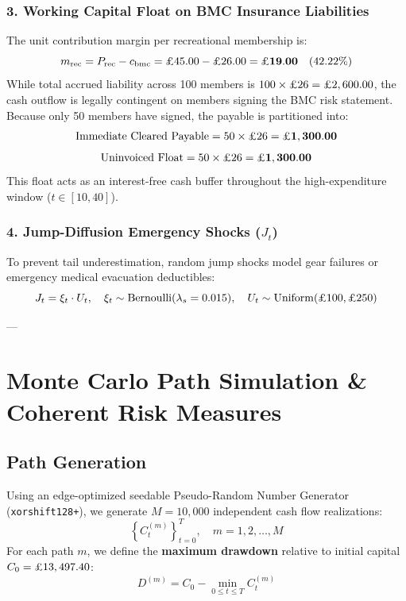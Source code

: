 \documentclass[11pt,a4paper]{article}
\begin{document}
\subsubsection{3. Working Capital Float on BMC Insurance Liabilities}
The unit contribution margin per recreational membership is:
\begin{equation}
m_{\text{rec}} = P_{\text{rec}} - c_{\text{bmc}} = \text{\pounds}45.00 - \text{\pounds}26.00 = \mathbf{\text{\pounds}19.00} \quad (42.22\%)
\end{equation}
While total accrued liability across 100 members is $100 \times \text{\pounds}26 = \text{\pounds}2,600.00$, the cash outflow is legally contingent on members signing the BMC risk statement. Because only 50 members have signed, the payable is partitioned into:
\begin{equation}
\text{Immediate Cleared Payable} = 50 \times \text{\pounds}26 = \mathbf{\text{\pounds}1,300.00}
\end{equation}
\begin{equation}
\text{Uninvoiced Float} = 50 \times \text{\pounds}26 = \mathbf{\text{\pounds}1,300.00}
\end{equation}
This float acts as an interest-free cash buffer throughout the high-expenditure window ($t \in [10, 40]$).

\subsubsection{4. Jump-Diffusion Emergency Shocks ($J_t$)}
To prevent tail underestimation, random jump shocks model gear failures or emergency medical evacuation deductibles:
\begin{equation}
J_t = \xi_t \cdot U_t, \quad \xi_t \sim \operatorname{Bernoulli}(\lambda_s = 0.015), \quad U_t \sim \operatorname{Uniform}(\text{\pounds}100, \text{\pounds}250)
\end{equation}

---

\section{Monte Carlo Path Simulation \& Coherent Risk Measures}

\subsection{Path Generation}
Using an edge-optimized seedable Pseudo-Random Number Generator (\texttt{xorshift128+}), we generate $M = 10,000$ independent cash flow realizations:
\begin{equation}
\left\{ C_t^{(m)} \right\}_{t=0}^T, \quad m = 1, 2, \dots, M
\end{equation}
For each path $m$, we define the \textbf{maximum drawdown} relative to initial capital $C_0 = \text{\pounds}13,497.40$:
\begin{equation}
D^{(m)} = C_0 - \min_{0 \le t \le T} C_t^{(m)}
\end{equation}
\end{document}
